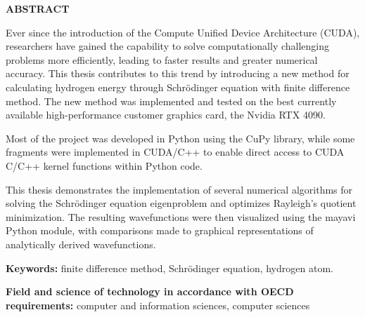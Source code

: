 \noindent
\begingroup
\fontsize{12pt}{1.5pt}\selectfont
\textbf{ABSTRACT}
\endgroup

\vspace{3mm}

Ever since the introduction of the Compute Unified Device Architecture (CUDA), researchers have gained the capability to solve computationally challenging problems more efficiently, leading to faster results and greater numerical accuracy. This thesis contributes to this trend by introducing a new method for calculating hydrogen energy through Schr{\"o}dinger equation with finite difference method. The new method was implemented and tested on the best currently available high-performance customer graphics card, the Nvidia RTX 4090.

Most of the project was developed in Python using the CuPy library, while some fragments were implemented in CUDA/C++ to enable direct access to CUDA C/C++ kernel functions within Python code.

This thesis demonstrates the implementation of several numerical algorithms for solving the Schrödinger equation eigenproblem and optimizes Rayleigh's quotient minimization. The resulting wavefunctions were then visualized using the mayavi Python module, with comparisons made to graphical representations of analytically derived wavefunctions.

\textbf{Keywords:} finite difference method, Schrödinger equation, hydrogen atom.

\textbf{Field and science of technology in accordance with OECD requirements:}
computer and information sciences, computer sciences
